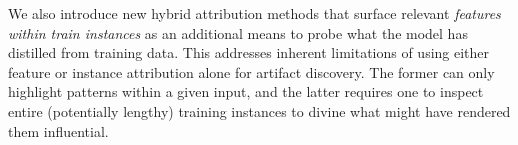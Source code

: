 \documentclass[11pt]{article}
\begin{document}
We also introduce new hybrid attribution methods that surface relevant \emph{features within train instances} as an additional means to probe what the model has distilled from training data.
This addresses inherent limitations of using either feature or instance attribution alone for artifact discovery. 
The former %
can only highlight patterns within a given input, and the latter requires one to inspect entire (potentially lengthy) training instances to divine what might have rendered them influential.

%
%
%
% 


\end{document}

